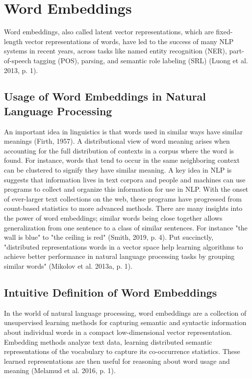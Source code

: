 \section{Word Embeddings}

Word embeddings, also called latent vector representations, which are fixed-length vector representations of words, have led to the success of many NLP systems in recent years, across tasks like named entity recognition (NER), part-of-speech tagging (POS), parsing, and semantic role labeling (SRL) (Luong et al. 2013, p. 1).

\subsection{Usage of Word Embeddings in Natural Language Processing}
An important idea in linguistics is that words used in similar ways have similar meanings (Firth, 1957). A distributional view of word meaning arises when accounting for the full distribution of contexts in a corpus where the word is found. For instance, words that tend to occur in the same neighboring context can be clustered to signify they have similar meaning. A key idea in NLP is suggests that information lives in text corpora and people and machines can use programs to collect and organize this information for use in NLP. With the onset of ever-larger text collections on the web, these programs have progressed from count-based statistics to more advanced methods. There are many insights into the power of word embeddings; similar words being close together allows generalization from one sentence to a class of similar sentences. For instance "the wall is blue" to "the ceiling is red" (Smith, 2019, p. 4). Put succinctly, "distributed representations words in a vector space help learning algorithms to achieve better performance in natural language processing tasks by grouping similar words" (Mikolov et al. 2013a, p. 1). 


\subsection{Intuitive Definition of Word Embeddings}
In the world of natural language processing, word embeddings are a collection of unsupervised learning methods for capturing semantic and syntactic information about individual words in a compact low-dimensional vector representation. Embedding methods analyze text data, learning distributed semantic representations of the vocabulary to capture its co-occurrence statistics. These learned representations are then useful for reasoning about word usage and meaning (Melamud et al. 2016, p. 1). 

